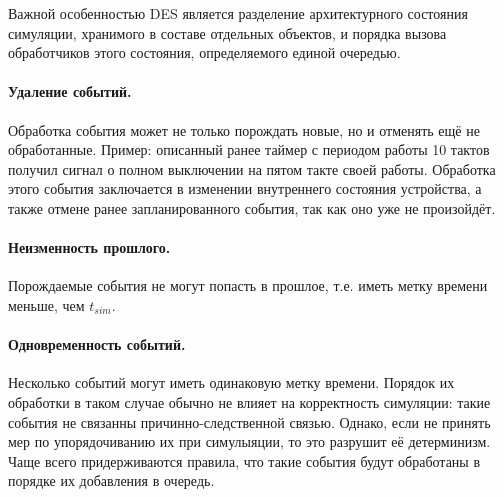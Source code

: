 \begin{digression}
Важной особенностью DES является разделение архитектурного состояния симуляции, хранимого в составе отдельных объектов, и порядка вызова обработчиков этого состояния, определяемого единой очередью.
\end{digression}




\paragraph{Удаление событий.} Обработка события может не только порождать новые, но и отменять ещё не обработанные. Пример: описанный ранее таймер с периодом работы 10 тактов получил сигнал о  полном выключении на пятом такте своей работы. Обработка этого события заключается в изменении внутреннего состояния устройства, а также отмене ранее запланированного события, так как оно уже не произойдёт.

\paragraph{Неизменность прошлого.} Порождаемые события не могут попасть в прошлое, т.е. иметь метку времени меньше, чем $t_{sim}$.

\paragraph{Одновременность событий.} Несколько событий могут иметь одинаковую метку времени. Порядок их обработки в таком случае обычно не влияет на корректность симуляции: такие события не связанны причинно-следственной связью. Однако, если не принять мер по упорядочиванию их при симулыяции, то это разрушит её детерминизм. Чаще всего придерживаются правила, что такие события будут обработаны в порядке их добавления в очередь.

